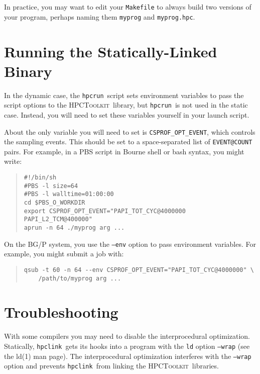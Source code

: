 \documentclass[12pt]{article}
\newcommand{\HPCToolkit}{\textsc{HPCToolkit}}
\newcommand{\hpcrun}{\texttt{hpcrun}}
\newcommand{\hpclink}{\texttt{hpclink}}
\begin{document}
In practice, you may want to edit your {\tt Makefile} to always build
two versions of your program, perhaps naming them {\tt myprog} and
{\tt myprog.hpc}.

\section{Running the Statically-Linked Binary}

In the dynamic case, the \hpcrun\ script sets environment variables to
pass the script options to the \HPCToolkit\ library, but \hpcrun\ is
not used in the static case.  Instead, you will need to set these
variables yourself in your launch script.

About the only variable you will need to set is
{\tt CSPROF\_OPT\_EVENT}, which controls the sampling events.  This
should be set to a space-separated list of {\tt EVENT@COUNT} pairs.
For example, in a PBS script in Bourne shell or bash syntax, you might
write:

\begin{quote}
\begin{verbatim}
#!/bin/sh
#PBS -l size=64
#PBS -l walltime=01:00:00
cd $PBS_O_WORKDIR
export CSPROF_OPT_EVENT="PAPI_TOT_CYC@4000000 PAPI_L2_TCM@400000"
aprun -n 64 ./myprog arg ...
\end{verbatim}
\end{quote}

On the BG/P system, you use the {\tt --env} option to pass environment
variables.  For example, you might submit a job with:

\begin{quote}
\begin{verbatim}
qsub -t 60 -n 64 --env CSPROF_OPT_EVENT="PAPI_TOT_CYC@4000000" \
    /path/to/myprog arg ...
\end{verbatim}
\end{quote}

\section{Troubleshooting}

With some compilers you may need to disable the interprocedural
optimization.  Statically, \hpclink\ gets its hooks into a program
with the {\tt ld} option {\tt --wrap} (see the ld(1) man page).  The
interprocedural optimization interferes with the {\tt --wrap} option
and prevents \hpclink\ from linking the \HPCToolkit\ libraries.
\end{document}

